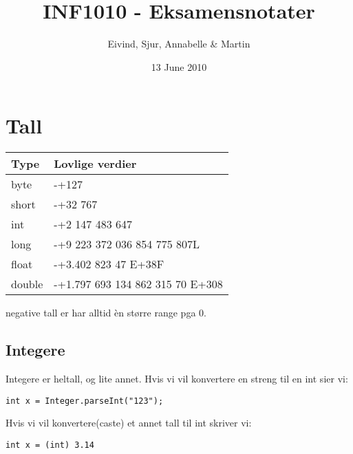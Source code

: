 \documentclass[11pt]{article}
\title{INF1010 - Eksamensnotater}
\author{Eivind, Sjur, Annabelle \& Martin}
\date{13 June 2010}
\begin{document}
\maketitle

\setcounter{tocdepth}{3}
\tableofcontents
\vspace*{1cm}
\section{Tall}
\label{sec-1}



\begin{center}
\begin{tabular}{ll}
\hline
 \textbf{Type}  &  \textbf{Lovlige verdier}          \\
\hline
 byte           &  -+127                             \\
\hline
 short          &  -+32 767                          \\
\hline
 int            &  -+2 147 483 647                   \\
\hline
 long           &  -+9 223 372 036 854 775 807L      \\
\hline
 float          &  -+3.402 823 47 E+38F              \\
\hline
 double         &  -+1.797 693 134 862 315 70 E+308  \\
\hline
\end{tabular}
\end{center}



  negative tall er har alltid èn større range pga 0. 
\subsection{Integere}
\label{sec-1_1}


   Integere er heltall, og lite annet.
   Hvis vi vil konvertere en streng til en int sier vi:
\begin{verbatim}
int x = Integer.parseInt("123");
\end{verbatim}
   Hvis vi vil konvertere(caste) et annet tall til int skriver vi:
\begin{verbatim}
int x = (int) 3.14
\end{verbatim}
\end{document}
